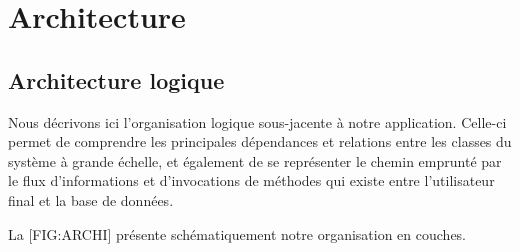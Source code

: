 \chapter[CH:ARCHI]{Architecture}

\section{Architecture logique}

Nous décrivons ici l'organisation logique sous-jacente à notre application.
Celle-ci permet de comprendre les principales dépendances et relations entre les classes du système à grande échelle, et également de se représenter le chemin emprunté par le flux d'informations et d'invocations de méthodes qui existe entre l'utilisateur final et la base de données.
\blank

La [FIG:ARCHI] présente schématiquement notre organisation en couches.

